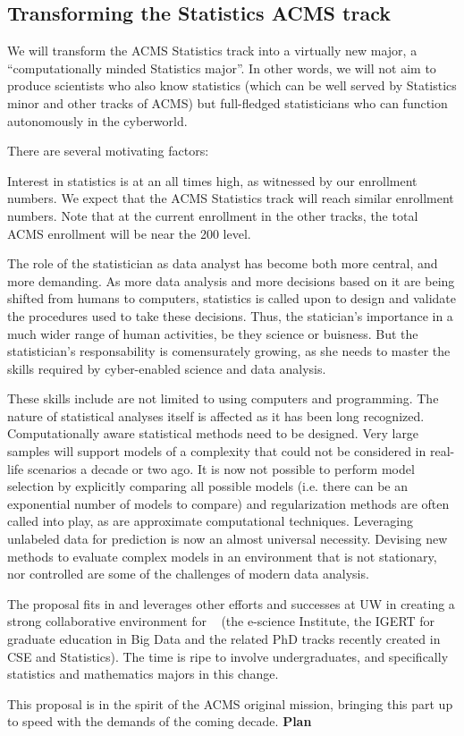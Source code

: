 \subsection{Transforming the Statistics  ACMS track}
We will transform the ACMS Statistics track into a virtually new
major, a ``computationally minded Statistics major''. In other words,
we will not aim to produce scientists who also know statistics (which
can be well served by Statistics minor and other tracks of ACMS) but
full-fledged statisticians who can function autonomously in the
cyberworld.

There are several motivating factors:
\bit
\item Interest in statistics is at an all times high, as witnessed by
  our enrollment numbers. We expect that the ACMS Statistics track
  will reach similar enrollment numbers. Note that at the current
  enrollment in the other tracks, the total ACMS enrollment will be
  near the 200 level.

\item The role of
  the statistician as data analyst has become both more central, and
  more demanding. As more data analysis and more decisions based on it
  are being shifted from humans to computers, statistics is called
  upon to design and validate the procedures used to take these
  decisions. Thus, the statician's importance in a much wider range of
  human activities, be they science or buisness. But the
  statistician's responsability is comensurately growing, as she needs
  to master the skills required by cyber-enabled science and data
  analysis.
\item These skills include are not limited to using computers and
  programming. The nature of statistical analyses itself is
  affected  as it has been long
  recognized. Computationally aware statistical methods need to be
  designed. Very large samples will support models of a complexity
  that could not be considered in real-life scenarios a decade or two
  ago. It is now not possible to perform model selection by explicitly
  comparing all possible models (i.e. there can be an exponential
  number of models to compare) and regularization methods are often
  called into play, as are approximate computational
  techniques. Leveraging unlabeled data for prediction is now an
  almost universal necessity. Devising new methods to evaluate complex
  models in an environment that is not stationary, nor controlled are
  some of the challenges of modern data analysis.
\item The proposal fits in and leverages other efforts and successes at UW in creating a strong collaborative environment for \cdse~ (the e-science Institute, the IGERT for graduate education in Big Data and the related PhD tracks recently created in CSE and Statistics). The time is ripe to involve undergraduates, and specifically statistics and mathematics majors in this change.
\item This proposal is in the spirit of the ACMS original mission,
  bringing this part up to speed with the demands of the coming decade.
\eit
{\bf Plan}

